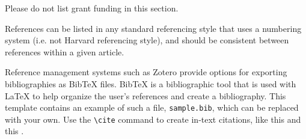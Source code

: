 \documentclass[10pt,a4paper,twocolumn]{article}
\begin{document}
Please do not list grant funding in this section.


{\small
}

\bigskip
References can be listed in any standard referencing style that uses a numbering system
(i.e. not Harvard referencing style), and should be consistent between references within
a given article.

Reference management systems such as Zotero provide options for exporting bibliographies as Bib\TeX{} files. Bib\TeX{} is a bibliographic tool that is used with \LaTeX{} to help organize the user's references and create a bibliography. This template contains an example of such a file, \texttt{sample.bib}, which can be replaced with your own. Use the \verb|\cite| command  to create in-text citations, like this \cite{Smith:2012qr} and this \cite{Smith:2013jd}.






\end{document}
